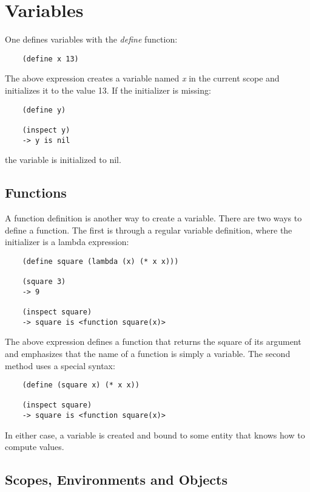 \chapter{Variables}
\label{Variables}

One defines variables with the {\it define} function:

\begin{verbatim}
    (define x 13)
\end{verbatim}

The above expression creates a variable named {\it x} in the current
scope and initializes it to the value 13.
If the initializer is missing:

\begin{verbatim}
    (define y)

    (inspect y)
    -> y is nil
\end{verbatim}

the variable is initialized to nil.

\section{Functions}

A function definition is another way to create a variable.
There are two ways to define a function. The first is through a 
regular variable definition, where the initializer is a lambda
expression:

\begin{verbatim}
    (define square (lambda (x) (* x x)))

    (square 3)
    -> 9

    (inspect square)
    -> square is <function square(x)>
\end{verbatim}

The above expression defines a function that returns the square of
its argument and emphasizes that the name of a function is
simply a variable. The second method uses a special syntax:

\begin{verbatim}
    (define (square x) (* x x))
    
    (inspect square)
    -> square is <function square(x)>
\end{verbatim}

In either case, a variable is created and bound to some entity
that knows how to compute values.

\section{Scopes, Environments and Objects}

